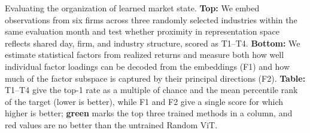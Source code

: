 \begin{table}[tp]
\caption{Evaluating the organization of learned market state. \textbf{Top:} We embed observations from six firms across three randomly selected industries within the same evaluation month and test whether proximity in representation space reflects shared day, firm, and industry structure, scored as T1--T4. \textbf{Bottom:} We estimate statistical factors from realized returns and measure both how well individual factor loadings can be decoded from the embeddings (F1) and how much of the factor subspace is captured by their principal directions (F2). \textbf{Table:} T1--T4 give the top-1 rate as a multiple of chance and the mean percentile rank of the target (lower is better), while F1 and F2 give a single score for which higher is better; \textcolor{green!45!black}{\textbf{green}} marks the top three trained methods in a column, and \textcolor{red!75!black}{red} values are no better than the untrained Random ViT.}
\label{tab:latent_results}
\end{table}
